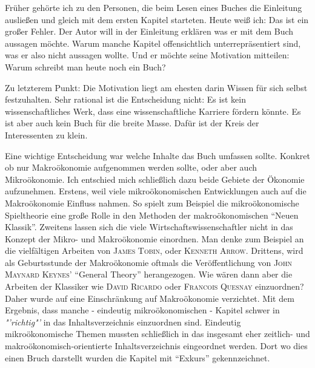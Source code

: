 %
%
%

\preface


Früher gehörte ich zu den Personen, die beim Lesen eines Buches die Einleitung ausließen und gleich mit dem ersten Kapitel starteten. Heute weiß ich: Das ist ein großer Fehler. Der Autor will in der Einleitung erklären was er mit dem Buch aussagen möchte. Warum manche Kapitel offensichtlich unterrepräsentiert sind, was er also nicht aussagen wollte. Und er möchte seine Motivation mitteilen: Warum schreibt man heute noch ein Buch?

Zu letzterem Punkt: Die Motivation liegt am ehesten darin Wissen für sich selbst festzuhalten. Sehr rational ist die Entscheidung nicht: Es ist kein wissenschaftliches Werk, dass eine wissenschaftliche Karriere fördern könnte. Es ist aber auch kein Buch für die breite Masse. Dafür ist der Kreis der Interessenten zu klein.

Eine wichtige Entscheidung war welche Inhalte das Buch umfassen sollte. Konkret ob nur Makroökonomie aufgenommen werden sollte, oder aber auch Mikroökonomie. Ich entschied mich schließlich dazu beide Gebiete der Ökonomie aufzunehmen. Erstens, weil viele mikroökonomischen Entwicklungen auch auf die Makroökonomie Einfluss nahmen. So spielt zum Beispiel die mikroökonomische Spieltheorie eine große Rolle in den Methoden der makroökonomischen "`Neuen Klassik"'. Zweitens lassen sich die viele Wirtschaftswissenschaftler nicht in das Konzept der Mikro- und Makroökonomie einordnen. Man denke zum Beispiel an die vielfältigen Arbeiten von \textsc{James Tobin}, oder \textsc{Kenneth Arrow}. Drittens, wird als Geburtsstunde der Makroökonomie oftmals die Veröffentlichung von \textsc{John Maynard Keynes'} "`General Theory"' herangezogen. Wie wären dann aber die Arbeiten der Klassiker wie \textsc{David Ricardo} oder \textsc{Francois Quesnay} einzuordnen?
Daher wurde auf eine Einschränkung auf Makroökonomie verzichtet. Mit dem Ergebnis, dass manche - eindeutig mikroökonomischen - Kapitel schwer in \textit{"'richtig"'} in das Inhaltsverzeichnis einzuordnen sind. Eindeutig mikroökonomische Themen mussten schließlich in das insgesamt eher zeitlich- und makroökonomisch-orientierte Inhaltsverzeichnis eingeordnet werden. Dort wo dies einen Bruch darstellt wurden die Kapitel mit "`Exkurs"' gekennzeichnet.

